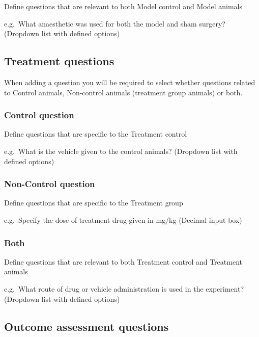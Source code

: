 \documentclass[
]{book}
\begin{document}
Define questions that are relevant to both Model control and Model animals

e.g.~What anaesthetic was used for both the model and sham surgery?
(Dropdown list with defined options)

\hypertarget{treatment-questions}{%
\subsection{Treatment questions}\label{treatment-questions}}

When adding a question you will be required to select whether questions related to Control animals, Non-control animals (treatment group animals) or both.

\hypertarget{control-question-1}{%
\subsubsection{Control question}\label{control-question-1}}

Define questions that are specific to the Treatment control

e.g.~What is the vehicle given to the control animals?
(Dropdown list with defined options)

\hypertarget{non-control-question-1}{%
\subsubsection{Non-Control question}\label{non-control-question-1}}

Define questions that are specific to the Treatment group

e.g.~Specify the dose of treatment drug given in mg/kg
(Decimal input box)

\hypertarget{both-1}{%
\subsubsection{Both}\label{both-1}}

Define questions that are relevant to both Treatment control and Treatment animals

e.g.~What route of drug or vehicle administration is used in the experiment?
(Dropdown list with defined options)

\hypertarget{outcome-assessment-questions}{%
\subsection{Outcome assessment questions}\label{outcome-assessment-questions}}
\end{document}
